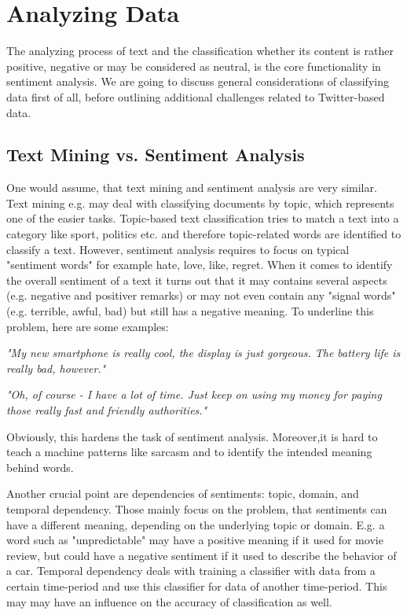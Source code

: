 \documentclass{acm_proc_article-sp}
\begin{document}
\section{Analyzing Data} \label{analyzingdata} The analyzing process of text
and the classification whether its content is rather positive, negative or may
be considered as neutral, is the core functionality in sentiment analysis. We
are going to discuss general considerations of classifying data first of all,
before outlining additional challenges related to Twitter-based data.

\subsection{Text Mining vs. Sentiment Analysis} One would assume, that text
mining and sentiment analysis are very similar. Text mining e.g. may deal with
classifying documents by topic, which represents one of the easier tasks.
Topic-based text classification tries to match a text into a category like
sport, politics etc. and therefore topic-related words are identified to
classify a text. However, sentiment analysis requires to focus on typical
"sentiment words" for example hate, love, like, regret.  When it comes to
identify the overall sentiment of a text it turns out that it may contains
several aspects (e.g. negative and positiver remarks) or may not even contain
any "signal words" (e.g. terrible, awful, bad) but still has a negative
meaning.  To underline this problem, here are some examples:

\textit{"My new smartphone is really cool, the display is just gorgeous. The
battery life is really bad, however."}

\textsl{"Oh, of course - I have a lot of time. Just keep on using my money for
paying those really fast and friendly authorities."}

Obviously, this hardens the task of sentiment analysis. Moreover,it is hard to
teach a machine patterns like sarcasm and to identify the intended meaning
behind words.  \cite{liu2010sentimentanalysis,pang2008opinion}


Another crucial point are dependencies of sentiments: topic, domain, and
temporal dependency. Those mainly focus on the problem, that sentiments can
have a different meaning, depending on the underlying topic or domain. E.g. a
word such as "unpredictable" may have a positive meaning if it used for movie
review, but could have a negative sentiment if it used to describe the behavior
of a car. Temporal dependency deals with training a classifier with data from a
certain time-period and use this classifier for data of another time-period.
This may may have an influence on the accuracy of classification as well.
\cite{read2005using,pang2008opinion}
\end{document}

